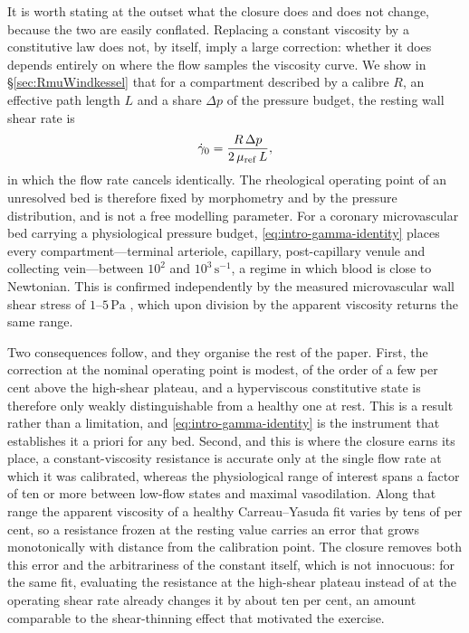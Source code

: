 \documentclass[lineno]{jfm}
\begin{document}
It is worth stating at the outset what the closure does and does not change,
because the two are easily conflated. Replacing a constant viscosity by a
constitutive law does not, by itself, imply a large correction: whether it does
depends entirely on where the flow samples the viscosity curve. We show in
\S\ref{sec:RmuWindkessel} that for a compartment described by a calibre $R$, an
effective path length $L$ and a share $\Delta p$ of the pressure budget, the
resting wall shear rate is
\begin{equation}
\dot{\gamma}_{0}=\frac{R\,\Delta p}{2\,\mu_{\rm ref}\,L},
\label{eq:intro-gamma-identity}
\end{equation}
in which the flow rate cancels identically. The rheological operating point of
an unresolved bed is therefore fixed by morphometry and by the pressure
distribution, and is not a free modelling parameter. For a coronary
microvascular bed carrying a physiological pressure budget, \eqref{eq:intro-gamma-identity}
places every compartment---terminal arteriole, capillary, post-capillary venule
and collecting vein---between $10^{2}$ and $10^{3}\,\mathrm{s}^{-1}$, a regime in
which blood is close to Newtonian. This is confirmed independently by the
measured microvascular wall shear stress of $1$--$5\,\mathrm{Pa}$
\citep{Chien1987}, which upon division by the apparent viscosity returns the
same range.

Two consequences follow, and they organise the rest of the paper. First, the
correction at the nominal operating point is modest, of the order of a few per
cent above the high-shear plateau, and a hyperviscous constitutive state is
therefore only weakly distinguishable from a healthy one at rest. This is a
result rather than a limitation, and \eqref{eq:intro-gamma-identity} is the
instrument that establishes it a priori for any bed. Second, and this is where the
closure earns its place, a constant-viscosity resistance is accurate only at the
single flow rate at which it was calibrated, whereas the physiological range of
interest spans a factor of ten or more between low-flow states and maximal
vasodilation. Along that range the apparent viscosity of a healthy
Carreau--Yasuda fit varies by tens of per cent, so a resistance frozen at the
resting value carries an error that grows monotonically with distance from the
calibration point. The closure removes both this error and the arbitrariness of
the constant itself, which is not innocuous: for the same fit, evaluating the
resistance at the high-shear plateau instead of at the operating shear rate
already changes it by about ten per cent, an amount comparable to the shear-thinning
effect that motivated the exercise.
\end{document}

